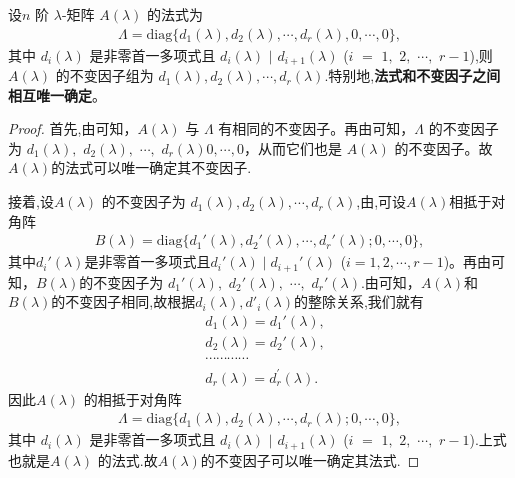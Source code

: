 \documentclass[../../main.tex]{subfiles}
\begin{document}
\begin{corollary}\label{corollary:不变因子和法式相互唯一确定}
设$n$ 阶 $\lambda$-矩阵 $A(\lambda)$ 的法式为
\begin{align*}
\varLambda=\mathrm{diag}\{d_1(\lambda),d_2(\lambda),\cdots,d_r(\lambda),0,\cdots,0\},
\end{align*}
其中 $d_i(\lambda)$ 是非零首一多项式且 $d_i(\lambda)$ $\mid$ $ d_{i + 1}(\lambda)$ ($i$ $=$ $1,$ $2,$ $\cdots,$ $r - 1$),则 $A(\lambda)$ 的不变因子组为 $d_1(\lambda),d_2(\lambda),\cdots,d_r(\lambda)$.特别地,\textbf{法式和不变因子之间相互唯一确定}。
\end{corollary}
\begin{proof}
首先,由可知，$A(\lambda)$ 与 $\varLambda$ 有相同的不变因子。再由可知，$\varLambda$ 的不变因子为 $d_1(\lambda),$ $d_2(\lambda),$ $\cdots,$ $d_r(\lambda)0,\cdots,0$，从而它们也是 $A(\lambda)$ 的不变因子。故$A(\lambda)$的法式可以唯一确定其不变因子.

接着,设$A(\lambda)$ 的不变因子为 $d_1(\lambda),d_2(\lambda),\cdots,d_r(\lambda)$,由,可设$A(\lambda)$相抵于对角阵
\begin{align}
B(\lambda)=\mathrm{diag}\{d_1'(\lambda),d_2'(\lambda),\cdots,d_r'(\lambda);0,\cdots,0\},
\end{align}
其中$d_i'(\lambda)$是非零首一多项式且$d_i'(\lambda)\mid d_{i + 1}'(\lambda)$ ($i = 1,2,\cdots,r - 1$)。再由可知，$B(\lambda)$的不变因子为 $d_1'(\lambda),$ $d_2'(\lambda),$ $\cdots,$ $d_r'(\lambda)$.由可知，$A(\lambda)$和$B(\lambda)$的不变因子相同,故根据$d_i(\lambda),d'_i(\lambda)$的整除关系,我们就有
\begin{align*}
&d_1\left( \lambda \right) =d_1'(\lambda ),
\\
&d_2\left( \lambda \right) =d_2' (\lambda ),
\\
&\cdots \cdots \cdots \cdots 
\\
&d_r\left( \lambda \right) =d_{r}^{\prime}\left( \lambda \right) .
\end{align*}
因此$A(\lambda)$ 的相抵于对角阵
\begin{align*}
\varLambda=\mathrm{diag}\{d_1(\lambda),d_2(\lambda),\cdots,d_r(\lambda);0,\cdots,0\},
\end{align*}
其中 $d_i(\lambda)$ 是非零首一多项式且 $d_i(\lambda)$ $\mid$ $ d_{i + 1}(\lambda)$ ($i$ $=$ $1,$ $2,$ $\cdots,$ $r - 1$).上式也就是$A(\lambda)$ 的法式.故$A(\lambda)$的不变因子可以唯一确定其法式.

\end{proof}
\end{document}
